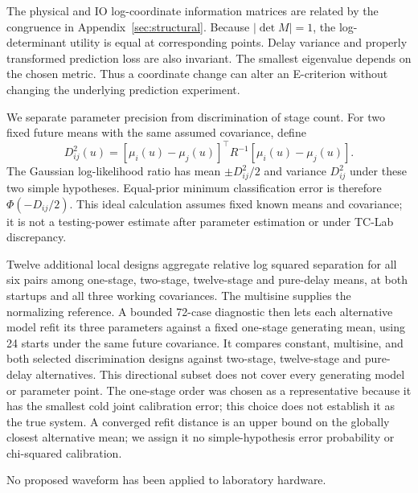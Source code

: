 The physical and IO log-coordinate information matrices are related by the
congruence in Appendix~\ref{sec:structural}. Because $|\det M|=1$, the
log-determinant utility is equal at corresponding points. Delay variance and
properly transformed prediction loss are also invariant. The smallest
eigenvalue depends on the chosen metric. Thus a coordinate change can alter
an E-criterion without changing the underlying prediction experiment.

We separate parameter precision from discrimination of stage count. For two
fixed future means with the same assumed covariance, define
\[
 D_{ij}^2(u)=[\mu_i(u)-\mu_j(u)]^\top R^{-1}[\mu_i(u)-\mu_j(u)].
\]
The Gaussian log-likelihood ratio has mean $\pm D_{ij}^2/2$ and variance
$D_{ij}^2$ under these two simple hypotheses. Equal-prior minimum classification
error is therefore $\Phi(-D_{ij}/2)$. This ideal calculation assumes fixed known
means and covariance; it is not a testing-power estimate after parameter
estimation or under TC-Lab discrepancy.

Twelve additional local designs aggregate relative log squared separation for
all six pairs among one-stage, two-stage, twelve-stage and pure-delay means,
at both startups and all three working covariances. The multisine supplies the
normalizing reference. A bounded 72-case diagnostic then lets each alternative
model refit its three parameters against a fixed one-stage generating mean,
using 24 starts under the same future covariance. It compares constant,
multisine, and both selected discrimination designs against two-stage,
twelve-stage and pure-delay alternatives. This directional subset does not
cover every generating model or parameter point. The one-stage order was chosen
as a representative because it has the smallest cold joint calibration error;
this choice does not establish it as the true system. A converged refit distance
is an upper bound on the globally closest alternative mean; we assign it no
simple-hypothesis error probability or chi-squared calibration.

No proposed waveform has been applied to laboratory hardware.
